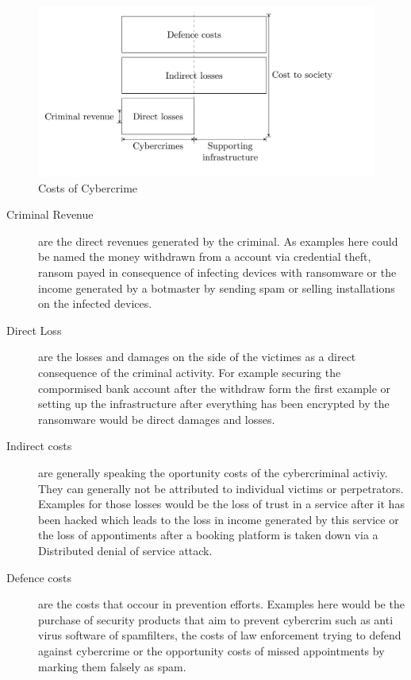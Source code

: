 \begin{figure}[ht]
\begin{center}
\includegraphics[scale=0.25]{Talk11/CostsCybercrime}
\end{center}
\caption{Costs of Cybercrime~\cite{Anderson19}}
\label{CostsCybercrime}
\end{figure}

\begin{description}
\item[Criminal Revenue] are the direct revenues generated by the criminal.
As examples here could be named the money withdrawn from a account via credential theft, ransom payed in consequence of infecting devices with ransomware or the income generated by a botmaster by sending spam or selling installations on the infected devices.\cite{Anderson19}

\item[Direct Loss]  are the losses  and damages on the side of the victimes as a direct consequence of the criminal activity.
For example securing the compormised bank account after the withdraw form the first example or setting up the infrastructure after everything has been encrypted by the ransomware would be direct damages and losses.\cite{Anderson19}

\item[Indirect costs] are generally speaking the oportunity costs of the cybercriminal activiy.
They can generally not be attributed to individual victims or perpetrators.
Examples for those losses would be the loss of trust in a service after it has been hacked which leads to the loss in income generated by this service or the loss of appontiments after a booking platform is taken down via a Distributed denial of service attack.\cite{Anderson19}

\item[Defence costs] are the costs that occour in prevention efforts.
Examples here would be the purchase of security products that aim to prevent cybercrim such as anti virus software of spamfilters, the costs of law enforcement trying to defend against cybercrime or the opportunity costs of missed appointments by marking them falsely as spam.\cite{Anderson19}
\end{description}

